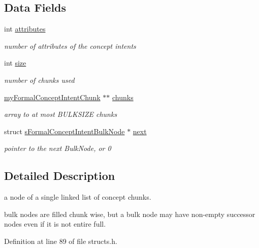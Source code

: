 \subsection*{\-Data \-Fields}
\begin{DoxyCompactItemize}
\item 
int \hyperlink{structsFormalConceptIntentBulkNode_a1fbfa6da3820560fef8549991a83e694}{attributes}
\begin{DoxyCompactList}\small\item\em number of attributes of the concept intents \end{DoxyCompactList}\item 
int \hyperlink{structsFormalConceptIntentBulkNode_afc96b660c7becf5517e4391846e0975f}{size}
\begin{DoxyCompactList}\small\item\em number of chunks used \end{DoxyCompactList}\item 
\hyperlink{easy_2structs_8h_ae552e1b13988c8c4ca0ab8f8a3e60f96}{my\-Formal\-Concept\-Intent\-Chunk} $\ast$$\ast$ \hyperlink{structsFormalConceptIntentBulkNode_a581d8ff2f4deebf047730cfd5be1f754}{chunks}
\begin{DoxyCompactList}\small\item\em array to at most \-B\-U\-L\-K\-S\-I\-Z\-E chunks \end{DoxyCompactList}\item 
struct \*
\hyperlink{structsFormalConceptIntentBulkNode}{s\-Formal\-Concept\-Intent\-Bulk\-Node} $\ast$ \hyperlink{structsFormalConceptIntentBulkNode_a1cff65c57653d96d207878be8614b383}{next}
\begin{DoxyCompactList}\small\item\em pointer to the next \-Bulk\-Node, or 0 \end{DoxyCompactList}\end{DoxyCompactItemize}


\subsection{\-Detailed \-Description}
a node of a single linked list of concept chunks. 

bulk nodes are filled chunk wise, but a bulk node may have non-\/empty successor nodes even if it is not entire full. 

\-Definition at line 89 of file structs.\-h.



